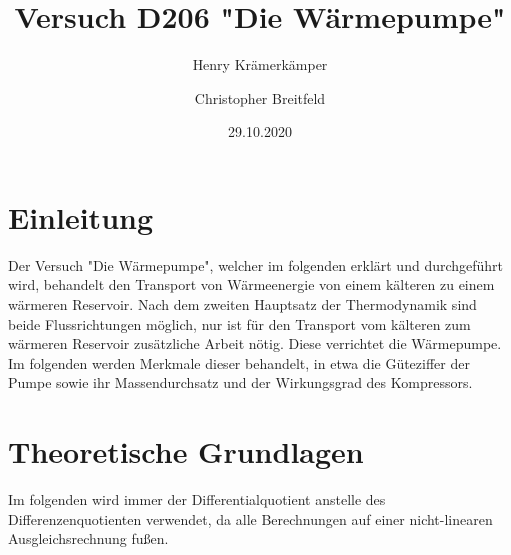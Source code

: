 \documentclass{scrartcl} %
\begin{document}
\title{Versuch D206 "Die Wärmepumpe"}
\author{Henry Krämerkämper \and Christopher Breitfeld}
\date{29.10.2020}
\maketitle
\newpage
\tableofcontents
\newpage
\section{Einleitung}
Der Versuch "Die Wärmepumpe", welcher im folgenden erklärt und durchgeführt wird, behandelt den Transport von
Wärmeenergie von einem kälteren zu einem wärmeren Reservoir. Nach dem zweiten Hauptsatz der Thermodynamik sind beide
Flussrichtungen möglich, nur ist für den Transport vom kälteren zum wärmeren Reservoir zusätzliche Arbeit nötig. Diese verrichtet die Wärmepumpe.
Im folgenden werden Merkmale dieser behandelt, in etwa die Güteziffer der Pumpe sowie ihr Massendurchsatz und der Wirkungsgrad des Kompressors.
\section{Theoretische Grundlagen}
Im folgenden wird immer der Differentialquotient anstelle des Differenzenquotienten verwendet, da alle Berechnungen auf einer nicht-linearen Ausgleichsrechnung fußen.
\end{document}
